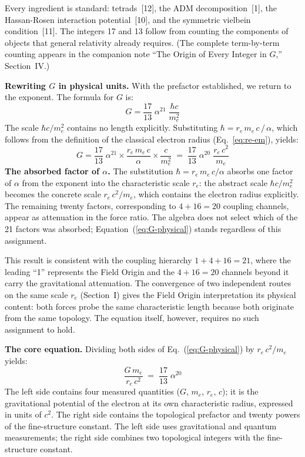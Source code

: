 \documentclass[11pt]{article}
\begin{document}
Every ingredient is standard: tetrads~[12], the ADM decomposition~[1], the Hassan-Rosen interaction potential~[10], and the symmetric vielbein condition~[11].
The integers 17 and 13 follow from counting the components of objects that general relativity already requires.
(The complete term-by-term counting appears in the companion note ``The Origin of Every Integer in $G$,'' Section~IV.)

\textbf{Rewriting $G$ in physical units.}\quad
With the prefactor established, we return to the exponent.
The formula for $G$ is:
%
\begin{equation}
G = \frac{17}{13}\;\alpha^{21}\;\frac{\hbar c}{m_e^2}
\label{eq:G-topological}
\end{equation}
%
The scale $\hbar c / m_e^2$ contains no length explicitly.
Substituting $\hbar = r_e\,m_e\,c\,/\,\alpha$, which follows from the definition of the classical electron radius (Eq.~\ref{eq:re-em}), yields:
%
\begin{equation}
G = \frac{17}{13}\;\alpha^{21} \times
    \frac{r_e\,m_e\,c}{\alpha} \times \frac{c}{m_e^2}
  \;=\; \frac{17}{13}\;\alpha^{20}\;\frac{r_e\,c^2}{m_e}
\label{eq:G-physical}
\end{equation}
%
\textbf{The absorbed factor of $\alpha$.}\quad
The substitution $\hbar = r_e\,m_e\,c/\alpha$ absorbs one factor of $\alpha$ from the exponent into the characteristic scale $r_e$: the abstract scale $\hbar c / m_e^2$ becomes the concrete scale $r_e\,c^2 / m_e$, which contains the electron radius explicitly.
The remaining twenty factors, corresponding to $4 + 16 = 20$ coupling channels, appear as attenuation in the force ratio.
The algebra does not select which of the 21 factors was absorbed; Equation~(\ref{eq:G-physical}) stands regardless of this assignment.

This result is consistent with the coupling hierarchy $1 + 4 + 16 = 21$, where the leading ``1'' represents the Field Origin and the $4 + 16 = 20$ channels beyond it carry the gravitational attenuation.
The convergence of two independent routes on the same scale $r_e$ (Section~I) gives the Field Origin interpretation its physical content: both forces probe the same characteristic length because both originate from the same topology.
The equation itself, however, requires no such assignment to hold.

\textbf{The core equation.}\quad
Dividing both sides of Eq.~(\ref{eq:G-physical}) by $r_e\,c^2 / m_e$ yields:
%
\begin{equation}
\frac{G\,m_e}{r_e\,c^2}
  \;=\; \frac{17}{13}\;\alpha^{20}
\label{eq:core}
\end{equation}
%
The left side contains four measured quantities ($G$, $m_e$, $r_e$, $c$); it is the gravitational potential of the electron at its own characteristic radius, expressed in units of $c^2$.
The right side contains the topological prefactor and twenty powers of the fine-structure constant.
The left side uses gravitational and quantum measurements; the right side combines two topological integers with the fine-structure constant.
\end{document}
